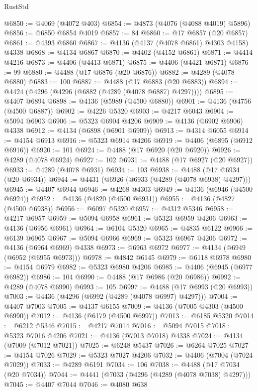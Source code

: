 \begin{lexlean}{RustStd}
\begin{coremodule}
{\begin{coremodule}
{{{{{{{{{{{{{{{{{{{{{{{{{{{{{{{{{{{{{{{{{{{{{{{{{{@6850 := @4069 (@4072 @403)
@6854 := @4873 (@4076 (@4088 @4019) @5896)
@6856 := @6850 @6854 @4019
@6857 := 84
@6860 := @17 @6857 (@20 @6857)
@6861 := @4393 @6860
@6867 := @4136 (@4137 (@4078 @6861) @4303 @4158) @4338
@6868 := @4134 @6867
@6870 := @4402 (@4152 @6861)
@6871 := @4414 @4216
@6873 := @4406 (@4413 @6871)
@6875 := @4406 (@4421 @6871)
@6876 := 99
@6880 := @4488 (@17 @6876 (@20 @6876))
@6882 := @4289 (@4078 @6880)
@6883 := 100
@6887 := @4488 (@17 @6883 (@20 @6883))
@6894 := @4424 (@4296 (@4296 (@6882 (@4289 (@4078 @6887) @4297))))
@6895 := @4407 @6894
@6898 := @4136 (@5989 (@4500 @6880))
@6901 := @4136 (@4756 (@4500 @6887))
@6902 := @4226 @5320
@6903 := @4217 @6043
@6904 := @5094 @6903
@6906 := @5323 @6904 @4206
@6909 := @4136 (@6902 @6906) @4338
@6912 := @4134 (@6898 (@6901 @6909))
@6913 := @4314 @6055
@6914 := @4154 @6913
@6916 := @5323 @6914 @4206
@6919 := @4406 (@6895 (@6912 @6916))
@6920 := 101
@6924 := @4488 (@17 @6920 (@20 @6920))
@6926 := @4289 (@4078 @6924)
@6927 := 102
@6931 := @4488 (@17 @6927 (@20 @6927))
@6933 := @4289 (@4078 @6931)
@6934 := 103
@6938 := @4488 (@17 @6934 (@20 @6934))
@6944 := @4431 (@6926 (@6933 (@4289 (@4078 @6938) @4297)))
@6945 := @4407 @6944
@6946 := @4268 @4303
@6949 := @4136 (@6946 (@4500 @6924))
@6952 := @4136 (@4820 (@4500 @6931))
@6955 := @4136 (@4827 (@4500 @6938))
@6956 := @6097 @5320
@6957 := @4312 @5346
@6958 := @4217 @6957
@6959 := @5094 @6958
@6961 := @5323 @6959 @4206
@6963 := @4136 (@6956 @6961)
@6964 := @6104 @5320
@6965 := @4835 @6122
@6966 := @6139 @6965
@6967 := @5094 @6966
@6969 := @5323 @6967 @4206
@6972 := @4136 (@6964 @6969) @4338
@6973 := @6963 @6972
@6977 := @4134 (@6949 (@6952 (@6955 @6973)))
@6978 := @4842 @6145
@6979 := @6118 @6978
@6980 := @4154 @6979
@6982 := @5323 @6980 @4206
@6985 := @4406 (@6945 (@6977 @6982))
@6986 := 104
@6990 := @4488 (@17 @6986 (@20 @6986))
@6992 := @4289 (@4078 @6990)
@6993 := 105
@6997 := @4488 (@17 @6993 (@20 @6993))
@7003 := @4436 (@4296 (@6992 (@4289 (@4078 @6997) @4297)))
@7004 := @4407 @7003
@7005 := @4137 @6155
@7009 := @4136 (@7005 @4303 (@4500 @6990))
@7012 := @4136 (@6179 (@4500 @6997))
@7013 := @6185 @5320
@7014 := @6212 @5346
@7015 := @4217 @7014
@7016 := @5094 @7015
@7018 := @5323 @7016 @4206
@7021 := @4136 (@7013 @7018) @4338
@7024 := @4134 (@7009 (@7012 @7021))
@7025 := @6248 @5437
@7026 := @6264 @7025
@7027 := @4154 @7026
@7029 := @5323 @7027 @4206
@7032 := @4406 (@7004 (@7024 @7029))
@7033 := @4289 @6191
@7034 := 106
@7038 := @4488 (@17 @7034 (@20 @7034))
@7044 := @4441 (@7033 (@4296 (@4289 (@4078 @7038) @4297)))
@7045 := @4407 @7044
@7046 := @4080 @638
}}}}}}}}}}}}}}}}}}}}}}}}}}}}}}}}}}}}}}}}}}}}}}}}}}
\end{coremodule}}
\end{coremodule}
\end{lexlean}
